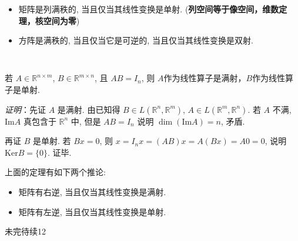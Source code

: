 \begin{itemize}
\item 矩阵是列满秩的, 当且仅当其线性变换是单射. (\textbf{列空间等于像空间，维数定理，核空间为零})
\end{itemize}

\begin{itemize}
\item 方阵是满秩的, 当且仅当它是可逆的, 当且仅当其线性变换是双射. \end{itemize}
\verb| |

\begin{theorem}{}
若 $A\in\mathbb{R}^{n\times m}$, $B\in\mathbb{R}^{m\times n}$, 且 $AB=I_n$, 则 $A$作为线性算子是满射，$B$作为线性算子是单射.

\textsl{证明}：先证 $A$ 是满射. 由已知得 $B\in L(\mathbb{R}^{n},\mathbb{R}^{m})$, $A\in L(\mathbb{R}^{m},\mathbb{R}^{n})$.
若 $A$ 不满, $\mathrm{Im}A$ 真包含于 $\mathbb{R}^{n}$ 中, 但是 $AB=I_{n}$
说明 $\dim(\mathrm{Im}A)=n$, 矛盾. 

再证 $B$ 是单射. 若 $Bx=0$, 则 $x=I_{n}x=(AB)x=A(Bx)=A0=0$, 说明 $\mathrm{Ker}B=\{0\}$.
证毕. 
\end{theorem}

上面的定理有如下两个推论:

\begin{itemize}
\item 矩阵有右逆, 当且仅当其线性变换是满射. \end{itemize}

\begin{itemize}
\item 矩阵有左逆, 当且仅当其线性变换是单射. 
\end{itemize}

未完待续12